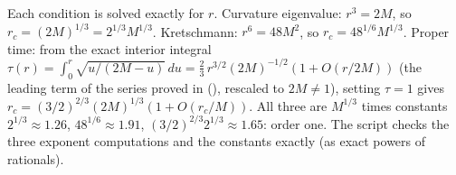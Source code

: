 Each condition is solved exactly for $r$. Curvature eigenvalue: $r^3 = 2M$, so $r_c = (2M)^{1/3} = 2^{1/3}M^{1/3}$. Kretschmann: $r^6 = 48M^2$, so $r_c = 48^{1/6}M^{1/3}$. Proper time: from the exact interior integral $\tau(r) = \int_0^r \sqrt{u/(2M - u)}\,du = \tfrac{2}{3}\,r^{3/2}(2M)^{-1/2}(1 + O(r/2M))$ (the leading term of the series proved in \cite[Lem.~5.1]{ButlerT6} (), rescaled to $2M \neq 1$), setting $\tau = 1$ gives $r_c = (3/2)^{2/3}(2M)^{1/3}(1 + O(r_c/M))$. All three are $M^{1/3}$ times constants $2^{1/3} \approx 1.26$, $48^{1/6} \approx 1.91$, $(3/2)^{2/3}2^{1/3} \approx 1.65$: order one. The script checks the three exponent computations and the constants exactly (as exact powers of rationals).
